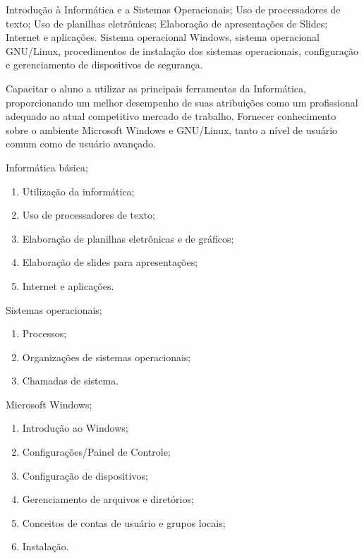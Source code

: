 \begin{pud}

	\ementa
	Introdução à Informática e a Sistemas Operacionais; Uso de processadores de texto; Uso de planilhas eletrônicas; Elaboração de apresentações de Slides;  Internet e aplicações. Sistema operacional Windows, sistema operacional GNU/Linux, procedimentos de instalação dos sistemas operacionais, configuração e gerenciamento de dispositivos de segurança.
	
	\objetivos
	Capacitar o aluno a utilizar as principais ferramentas da Informática, proporcionando um melhor desempenho de suas atribuições como um profissional adequado ao atual competitivo mercado de trabalho.  Fornecer conhecimento sobre o ambiente Microsoft Windows e GNU/Linux, tanto a nível de usuário comum como de usuário avançado.
	
	\programa
	\begin{description}[itemsep=0em]
	   	\item[UNIDADE I:] Informática básica;
	         \begin{enumerate}[itemsep=0em, topsep=0em]                
				\item Utilização da informática;
                \item Uso de processadores de texto;
                \item  Elaboração de planilhas eletrônicas e de gráficos;
                \item  Elaboração de slides para apresentações;
                \item Internet e aplicações.
            \end{enumerate}
 
        \item[UNIDADE II:]  Sistemas operacionais;
	         \begin{enumerate}[itemsep=0em, topsep=0em]
	         	\item Processos;
				\item Organizações de sistemas operacionais;
				\item Chamadas de sistema. 
                
            \end{enumerate}
 
        \item[UNIDADE III:] Microsoft Windows;
	         \begin{enumerate}[itemsep=0em, topsep=0em]                
				\item Introdução ao Windows;
				\item Configurações/Painel de Controle;
				\item  Configuração de dispositivos;
				\item Gerenciamento de arquivos e diretórios;
				\item Conceitos de contas de usuário e grupos locais;
				\item Instalação.                
            \end{enumerate}


\end{description}
\end{pud}
